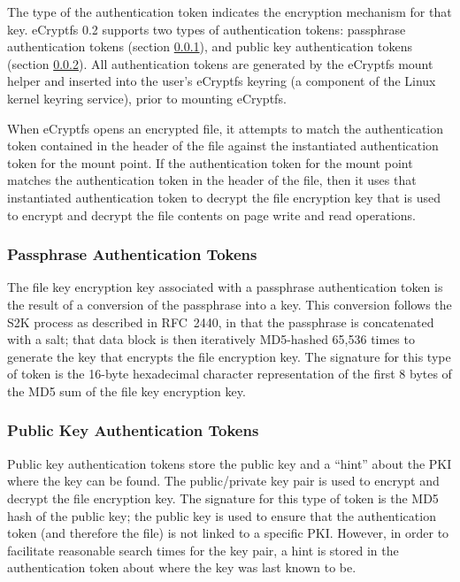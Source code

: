 \documentclass{article}
\begin{document}
The type of the authentication token indicates the encryption
mechanism for that key. eCryptfs 0.2 supports two types of authentication
tokens: passphrase authentication tokens (section \ref{passphrase_auth_tok}),
and public key authentication tokens (section \ref{pub_key_auth_tok}).
All authentication tokens are generated by the eCryptfs mount helper 
and inserted into the user's eCryptfs keyring
(a component of the Linux kernel keyring service), prior to mounting eCryptfs.

When eCryptfs opens an encrypted file, it attempts to match the
authentication token contained in the header of the file against the
instantiated authentication token for the mount point. If the
authentication token for the mount point matches the authentication
token in the header of the file, then it uses that instantiated
authentication token to decrypt the file encryption key that is used to
encrypt and decrypt the file contents on page write and read
operations.

\subsubsection{Passphrase Authentication Tokens}
\label{passphrase_auth_tok}

The file key encryption key associated with a passphrase authentication
token is the result of a conversion of the passphrase into a key.
This conversion follows the
S2K process as described in RFC~2440, in that the passphrase is
concatenated with a salt; that data block is then iteratively
MD5-hashed 65,536 times to generate the key that encrypts the file
encryption key. The signature for this type of token is the 16-byte
hexadecimal character representation of the first 8 bytes of the MD5 sum
of the file key encryption key.

\subsubsection{Public Key Authentication Tokens}
\label{pub_key_auth_tok}

Public key authentication tokens store the public key and a ``hint''
about the PKI where the key can be found. The public/private key pair
is used to encrypt and decrypt the file encryption key. The signature
for this type of token is the MD5 hash of the public key; the public
key is used to ensure that the authentication token (and therefore the
file) is not linked to a specific PKI. However, in order to facilitate
reasonable search times for the key pair, a hint is stored in the
authentication token about where the key was last known to be.
\end{document}
